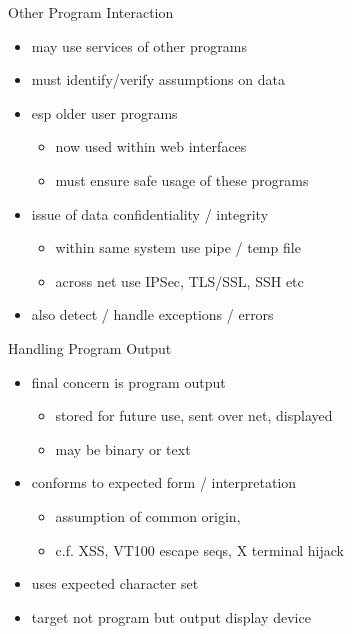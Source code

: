 \documentclass{beamer}
\begin{document}
\begin{frame}{Other Program Interaction}
  \begin{itemize}
  \item may use services of other programs
  \item must identify/verify assumptions on data
  \item esp older user programs
    \begin{itemize}
    \item now used within web interfaces
    \item must ensure safe usage of these programs
    \end{itemize}
  \item issue of data confidentiality / integrity
    \begin{itemize}
    \item within same system use pipe / temp file
    \item across net use IPSec, TLS/SSL, SSH etc
    \end{itemize}
  \item also detect / handle exceptions / errors
  \end{itemize}
\end{frame}


\begin{frame}{Handling Program Output}
  \begin{itemize}
  \item final concern is program output
    \begin{itemize}
    \item stored for future use, sent over net, displayed
    \item may be binary or text
    \end{itemize}
  \item conforms to expected form / interpretation
    \begin{itemize}
    \item assumption of common origin,
    \item c.f. XSS, VT100 escape seqs, X terminal hijack
    \end{itemize}
  \item uses expected character set
  \item target not program but output display device 
  \end{itemize}
\end{frame}
\end{document}
